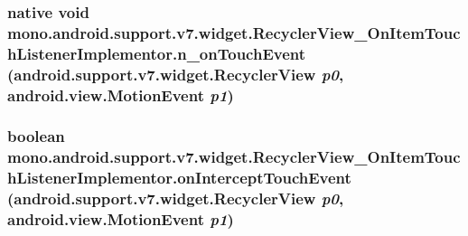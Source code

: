 \hypertarget{classmono_1_1android_1_1support_1_1v7_1_1widget_1_1_recycler_view___on_item_touch_listener_implementor_42498de05bb200b4fec8f1ccc907fcf2}{
\subsubsection[{n\_\-onTouchEvent}]{\setlength{\rightskip}{0pt plus 5cm}native void mono.android.support.v7.widget.RecyclerView\_\-OnItemTouchListenerImplementor.n\_\-onTouchEvent (android.support.v7.widget.RecyclerView {\em p0}, \/  android.view.MotionEvent {\em p1})}}
\label{classmono_1_1android_1_1support_1_1v7_1_1widget_1_1_recycler_view___on_item_touch_listener_implementor_42498de05bb200b4fec8f1ccc907fcf2}


\hypertarget{classmono_1_1android_1_1support_1_1v7_1_1widget_1_1_recycler_view___on_item_touch_listener_implementor_8a0736f0a9d7a6f76bda7054dcb41dba}{
\subsubsection[{onInterceptTouchEvent}]{\setlength{\rightskip}{0pt plus 5cm}boolean mono.android.support.v7.widget.RecyclerView\_\-OnItemTouchListenerImplementor.onInterceptTouchEvent (android.support.v7.widget.RecyclerView {\em p0}, \/  android.view.MotionEvent {\em p1})}}
\label{classmono_1_1android_1_1support_1_1v7_1_1widget_1_1_recycler_view___on_item_touch_listener_implementor_8a0736f0a9d7a6f76bda7054dcb41dba}


